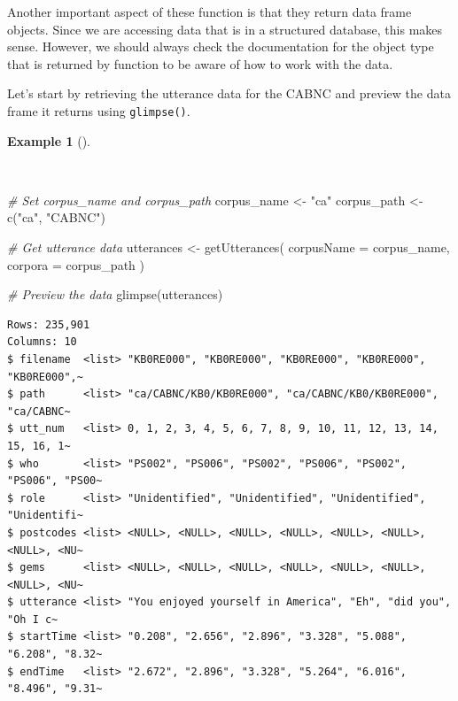 \documentclass[
  letterpaper,
]{latex/krantz}
\newenvironment{Shaded}{\begin{snugshade}}{\end{snugshade}}
\newcommand{\AttributeTok}[1]{\textcolor[rgb]{0.00,0.00,0.00}{#1}}
\newcommand{\CommentTok}[1]{\textcolor[rgb]{0.00,0.00,0.00}{\textit{#1}}}
\newcommand{\FunctionTok}[1]{\textcolor[rgb]{0.00,0.00,0.00}{#1}}
\newcommand{\NormalTok}[1]{\textcolor[rgb]{0.00,0.00,0.00}{#1}}
\newcommand{\OtherTok}[1]{\textcolor[rgb]{0.00,0.00,0.00}{#1}}
\newcommand{\StringTok}[1]{\textcolor[rgb]{0.00,0.00,0.00}{#1}}
\theoremstyle{definition}
\newtheorem{example}{Example}[chapter]
\theoremstyle{remark}
\begin{document}
Another important aspect of these function is that they return data
frame objects. Since we are accessing data that is in a structured
database, this makes sense. However, we should always check the
documentation for the object type that is returned by function to be
aware of how to work with the data.

Let's start by retrieving the utterance data for the CABNC and preview
the data frame it returns using \texttt{glimpse()}.

\begin{example}[]\protect\hypertarget{exm-acquire-get-utterances}{}\label{exm-acquire-get-utterances}

~

\begin{Shaded}
\begin{Highlighting}[]
\CommentTok{\# Set corpus\_name and corpus\_path}
\NormalTok{corpus\_name }\OtherTok{\textless{}{-}} \StringTok{"ca"}
\NormalTok{corpus\_path }\OtherTok{\textless{}{-}} \FunctionTok{c}\NormalTok{(}\StringTok{"ca"}\NormalTok{, }\StringTok{"CABNC"}\NormalTok{)}

\CommentTok{\# Get utterance data}
\NormalTok{utterances }\OtherTok{\textless{}{-}}
  \FunctionTok{getUtterances}\NormalTok{(}
    \AttributeTok{corpusName =}\NormalTok{ corpus\_name,}
    \AttributeTok{corpora =}\NormalTok{ corpus\_path}
\NormalTok{    )}

\CommentTok{\# Preview the data}
\FunctionTok{glimpse}\NormalTok{(utterances)}
\end{Highlighting}
\end{Shaded}

\begin{verbatim}
Rows: 235,901
Columns: 10
$ filename  <list> "KB0RE000", "KB0RE000", "KB0RE000", "KB0RE000", "KB0RE000",~
$ path      <list> "ca/CABNC/KB0/KB0RE000", "ca/CABNC/KB0/KB0RE000", "ca/CABNC~
$ utt_num   <list> 0, 1, 2, 3, 4, 5, 6, 7, 8, 9, 10, 11, 12, 13, 14, 15, 16, 1~
$ who       <list> "PS002", "PS006", "PS002", "PS006", "PS002", "PS006", "PS00~
$ role      <list> "Unidentified", "Unidentified", "Unidentified", "Unidentifi~
$ postcodes <list> <NULL>, <NULL>, <NULL>, <NULL>, <NULL>, <NULL>, <NULL>, <NU~
$ gems      <list> <NULL>, <NULL>, <NULL>, <NULL>, <NULL>, <NULL>, <NULL>, <NU~
$ utterance <list> "You enjoyed yourself in America", "Eh", "did you", "Oh I c~
$ startTime <list> "0.208", "2.656", "2.896", "3.328", "5.088", "6.208", "8.32~
$ endTime   <list> "2.672", "2.896", "3.328", "5.264", "6.016", "8.496", "9.31~
\end{verbatim}

\end{example}
\end{document}
